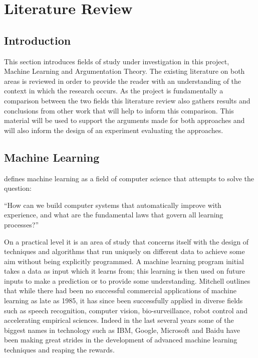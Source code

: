 
\chapter{Literature Review} %

\label{Chapter2} %



\section{Introduction}

This section introduces fields of study under investigation in this project, Machine Learning and Argumentation Theory. The existing literature on both areas is reviewed in order to provide the reader with an understanding of the context in which the research occurs. As the project is fundamentally a comparison between the two fields this literature review also gathers results and conclusions from other work that will help to inform this comparison. This material will be used to support the arguments made for both approaches and will also inform the design of an experiment evaluating the approaches.
\section{Machine Learning}

\cite{mitchell2006discipline} defines machine learning as a field of computer science that attempts to solve the question:

``How can we build computer systems that automatically improve with experience, and what are the fundamental laws that govern all learning processes?''

On a practical level it is an area of study that concerns itself with the design of techniques and algorithms that run uniquely on different data to achieve some aim without being explicitly programmed. A machine learning program initial takes a data as input which it learns from; this learning is then used on future inputs to make a prediction or to provide some understanding. Mitchell outlines that while there had been no successful commercial applications of machine learning as late as 1985, it has since been successfully applied in diverse fields such as speech recognition, computer vision, bio-surveillance, robot control and accelerating empirical sciences. Indeed in the last several years some of the biggest names in technology such as IBM, Google, Microsoft and Baidu have been making great strides in the development of advanced machine learning techniques and reaping the rewards.

